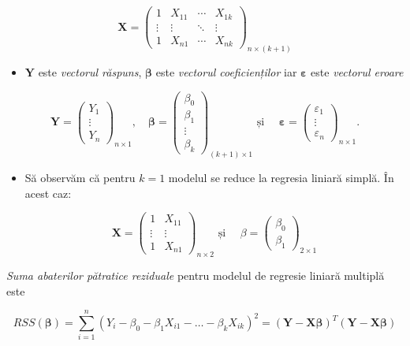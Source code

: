\documentclass[]{article}
\providecommand{\tightlist}{%
  \setlength{\itemsep}{0pt}\setlength{\parskip}{0pt}}
\newenvironment{rmdblock}[1]
  {\begin{shaded*}
  \begin{itemize}
  \renewcommand{\labelitemi}{
    \raisebox{-.7\height}[0pt][0pt]{
      {\setkeys{Gin}{width=2em,keepaspectratio}\texttt{[image: images/icons/\#1]}}
    }
  }
  \item
  }
  {
  \end{itemize}
  \end{shaded*}
  }
\newenvironment{rmdinsight}
  {\begin{rmdblock}{insight}}
  {\end{rmdblock}}
\begin{document}
\[
\mathbf{X}=\begin{pmatrix}
1 & X_{11} & \cdots & X_{1k}\\
\vdots & \vdots & \ddots & \vdots\\
1 & X_{n1} & \cdots & X_{nk}
\end{pmatrix}_{n\times(k+1)}
\]

\begin{itemize}
\tightlist
\item
  \(\mathbf{Y}\) este \emph{vectorul răspuns}, \(\boldsymbol\beta\) este
  \emph{vectorul coeficienților} iar \(\boldsymbol\varepsilon\) este
  \emph{vectorul eroare}
\end{itemize}

\[
\mathbf{Y}=\begin{pmatrix}
Y_1 \\
\vdots \\
Y_n
\end{pmatrix}_{n\times 1},\quad\boldsymbol\beta=\begin{pmatrix}
\beta_0 \\
\beta_1 \\
\vdots \\
\beta_k
\end{pmatrix}_{(k+1)\times 1}\text{ și }\quad
\boldsymbol\varepsilon=\begin{pmatrix}
\varepsilon_1 \\
\vdots \\
\varepsilon_n
\end{pmatrix}_{n\times 1}.
\]

\begin{rmdinsight}
Să observăm că pentru \(k=1\) modelul se reduce la regresia liniară
simplă. În acest caz:

\[
\mathbf{X}=\begin{pmatrix}
1 & X_{11}\\
\vdots & \vdots\\
1 & X_{n1}
\end{pmatrix}_{n\times2}\text{ și }\quad \beta=\begin{pmatrix}
\beta_0 \\
\beta_1 
\end{pmatrix}_{2\times 1}
\]
\end{rmdinsight}

\emph{Suma abaterilor pătratice reziduale} pentru modelul de regresie
liniară multiplă este

\[
RSS(\boldsymbol\beta)=\sum_{i=1}^n(Y_i-\beta_0-\beta_1X_{i1}-\ldots-\beta_kX_{ik})^2=(\mathbf{Y}-\mathbf{X}\boldsymbol{\beta})^T(\mathbf{Y}-\mathbf{X}\boldsymbol{\beta})
\]
\end{document}
